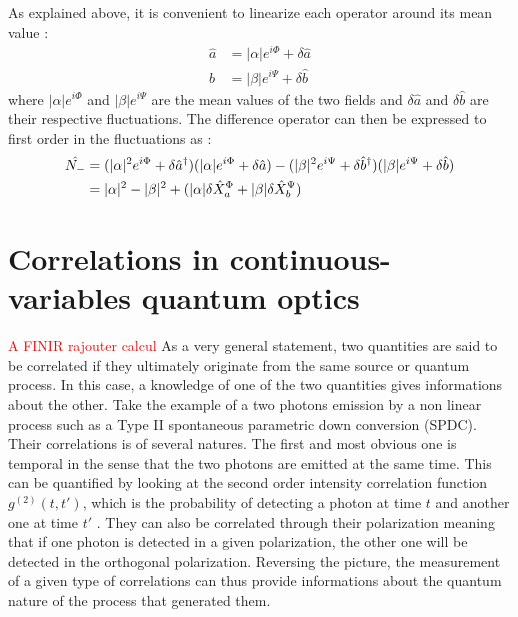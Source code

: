 As explained above, it is convenient to linearize each operator around its mean value :
\begin{equation}
    \begin{aligned}
    \hat{a} &= |\alpha|e^{i\Phi} + \delta \hat{a} \\
    \hat{b} &= |\beta|e^{i\Psi} + \delta \hat{b}
    \end{aligned}
\end{equation}
where $|\alpha|e^{i\Phi}$ and $|\beta|e^{i\Psi}$ are the mean values of the two fields and $\delta \hat{a}$ and $\delta \hat{b}$ are their respective fluctuations.
The difference operator can then be expressed to first order in the fluctuations as :
\begin{equation}
    \label{eq:diff_op2}
    \begin{aligned}
    \hat{N_-} &= (|\alpha|^2e^{i\Phi}+\delta \hat{a}^\dagger)(|\alpha|e^{i\Phi}+\delta \hat{a}) - (|\beta|^2e^{i\Psi}+\delta \hat{b}^\dagger)(|\beta|e^{i\Psi}+\delta \hat{b}) \\
    &= |\alpha|^2 - |\beta|^2 +(|\alpha|\delta \hat{X}_a^\Phi + |\beta|\delta \hat{X}_b^\Psi) 
    \end{aligned}
\end{equation}



\section{Correlations in continuous-variables quantum optics}
\textcolor{red}{A FINIR rajouter calcul}
\label{sec:corr_cv}
As a very general statement, two quantities are said to be correlated if they ultimately originate from the same source or quantum process. In this case, a knowledge of one of the two quantities gives informations about the other.
Take the example of a two photons emission by a non linear process such as a Type II spontaneous parametric down conversion (SPDC). Their correlations is of several natures. The first and most obvious one is temporal in the sense that the two photons are emitted at the same time. This can be
quantified by looking at the second order intensity correlation function $g^{(2)}(t,t')$, which is the probability of detecting a photon at time $t$ and another one at time $t'$ \cite{hanbury_brown_twiss_1956}. They can also 
be correlated through their polarization meaning that if one photon is detected in a given polarization, the other one will be detected in the orthogonal polarization. Reversing the picture,
the measurement of a given type of correlations can thus provide informations about the quantum nature of the process that generated them.


